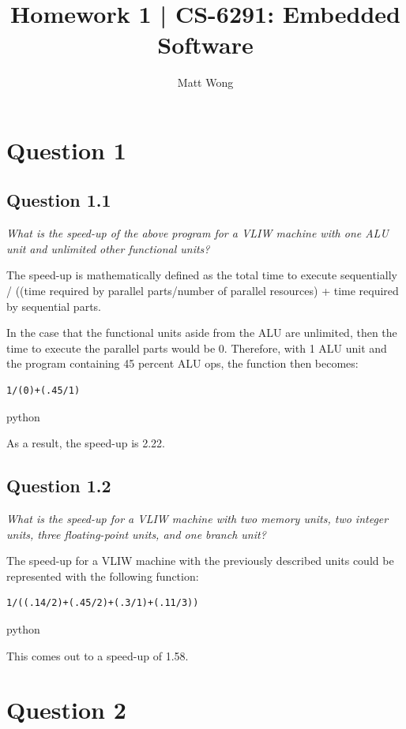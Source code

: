 \documentclass[
	letterpaper, %
]{jdf}
\author{Matt Wong}
\title{Homework 1 | CS-6291: Embedded Software}
\begin{document}

\maketitle

\setlength{\parskip}{\baselineskip}%
\section{Question 1}

\subsection{Question 1.1}
\textit{What is the speed-up of the above program for a VLIW machine with one ALU unit and unlimited other functional units?}

The speed-up is mathematically defined as the total time to execute sequentially / ((time required by parallel parts/number of parallel resources) + time required by sequential parts.

In the case that the functional units aside from the ALU are unlimited, then the time to execute the parallel parts would be 0.
Therefore, with 1 ALU unit and the program containing 45 percent ALU ops, the function then becomes:
\begin{verbatim}
1/(0)+(.45/1)
\end{verbatim}{python}

As a result, the speed-up is 2.22.

\subsection{Question 1.2}
\textit{What is the speed-up for a VLIW machine with two memory units, two integer units, three floating-point units, and one branch unit?}

The speed-up for a VLIW machine with the previously described units could be represented with the following function:

\begin{verbatim}
1/((.14/2)+(.45/2)+(.3/1)+(.11/3))
\end{verbatim}{python}

This comes out to a speed-up of 1.58.

\section{Question 2}
\end{document}
